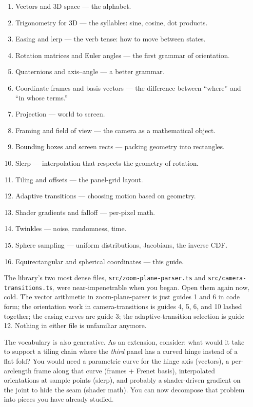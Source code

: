 \documentclass{article}
\begin{document}
\begin{enumerate}
  \item Vectors and 3D space --- the alphabet.
  \item Trigonometry for 3D --- the syllables: sine, cosine, dot products.
  \item Easing and lerp --- the verb tense: how to move between states.
  \item Rotation matrices and Euler angles --- the first grammar of orientation.
  \item Quaternions and axis--angle --- a better grammar.
  \item Coordinate frames and basis vectors --- the difference between ``where'' and ``in whose terms.''
  \item Projection --- world to screen.
  \item Framing and field of view --- the camera as a mathematical object.
  \item Bounding boxes and screen rects --- packing geometry into rectangles.
  \item Slerp --- interpolation that respects the geometry of rotation.
  \item Tiling and offsets --- the panel-grid layout.
  \item Adaptive transitions --- choosing motion based on geometry.
  \item Shader gradients and falloff --- per-pixel math.
  \item Twinkles --- noise, randomness, time.
  \item Sphere sampling --- uniform distributions, Jacobians, the inverse CDF.
  \item Equirectangular and spherical coordinates --- this guide.
\end{enumerate}

The library's two most dense files, \texttt{src/zoom-plane-parser.ts} and
\texttt{src/camera-transitions.ts}, were near-impenetrable when you began.
Open them again now, cold. The vector arithmetic in zoom-plane-parser is just
guides 1 and 6 in code form; the orientation work in camera-transitions is
guides 4, 5, 6, and 10 lashed together; the easing curves are guide 3; the
adaptive-transition selection is guide 12. Nothing in either file is unfamiliar
anymore.

The vocabulary is also generative. As an extension, consider: what would it
take to support a tiling chain where the \emph{third} panel has a curved
hinge instead of a flat fold? You would need a parametric curve for the
hinge axis (vectors), a per-arclength frame along that curve (frames + Frenet
basis), interpolated orientations at sample points (slerp), and probably a
shader-driven gradient on the joint to hide the seam (shader math). You can
now decompose that problem into pieces you have already studied.
\end{document}
